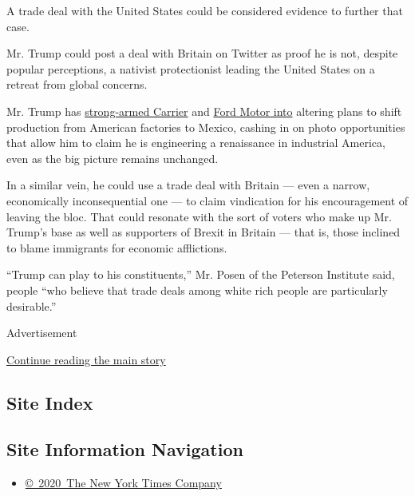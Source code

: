 A trade deal with the United States could be considered evidence to
further that case.

Mr. Trump could post a deal with Britain on Twitter as proof he is not,
despite popular perceptions, a nativist protectionist leading the United
States on a retreat from global concerns.

Mr. Trump has
\href{https://www.nytimes3xbfgragh.onion/2016/12/01/business/economy/trump-carrier-pence-jobs.html}{strong-armed
Carrier} and
\href{https://www.nytimes3xbfgragh.onion/2016/11/19/business/ford-move-cited-as-victory-by-trump-has-no-effect-on-us-jobs.html}{Ford
Motor into} altering plans to shift production from American factories
to Mexico, cashing in on photo opportunities that allow him to claim he
is engineering a renaissance in industrial America, even as the big
picture remains unchanged.

In a similar vein, he could use a trade deal with Britain --- even a
narrow, economically inconsequential one --- to claim vindication for
his encouragement of leaving the bloc. That could resonate with the sort
of voters who make up Mr. Trump's base as well as supporters of Brexit
in Britain --- that is, those inclined to blame immigrants for economic
afflictions.

``Trump can play to his constituents,'' Mr. Posen of the Peterson
Institute said, people ``who believe that trade deals among white rich
people are particularly desirable.''

Advertisement

\protect\hyperlink{after-bottom}{Continue reading the main story}

\hypertarget{site-index}{%
\subsection{Site Index}\label{site-index}}

\hypertarget{site-information-navigation}{%
\subsection{Site Information
Navigation}\label{site-information-navigation}}

\begin{itemize}
\tightlist
\item
  \href{https://help.nytimes3xbfgragh.onion/hc/en-us/articles/115014792127-Copyright-notice}{©~2020~The
  New York Times Company}
\end{itemize}

